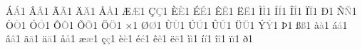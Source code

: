 {        {^^c1}{{\textcolor{gray}{\'{A}}}}1  %
        {^^c2}{{\textcolor{gray}{\^{A}}}}1  %
        {^^c3}{{\textcolor{gray}{\~{A}}}}1  %
        {^^c4}{{\textcolor{gray}{\"{A}}}}1  %
        {^^c5}{{\textcolor{gray}{\AA}}}1  %
        {^^c6}{{\textcolor{gray}{\AE}}}1  %
        {^^c7}{{\textcolor{gray}{\c{C}}}}1  %
        {^^c8}{{\textcolor{gray}{\`{E}}}}1  %
        {^^c9}{{\textcolor{gray}{\'{E}}}}1  %
        {^^ca}{{\textcolor{gray}{\^{E}}}}1  %
        {^^cb}{{\textcolor{gray}{\"{E}}}}1  %
        {^^cc}{{\textcolor{gray}{\`{I}}}}1  %
        {^^cd}{{\textcolor{gray}{\'{I}}}}1  %
        {^^ce}{{\textcolor{gray}{\^{I}}}}1  %
        {^^cf}{{\textcolor{gray}{\"{I}}}}1  %
        {^^d0}{{\textcolor{gray}{\DH}}}1  %
        {^^d1}{{\textcolor{gray}{\~{N}}}}1  %
        {^^d2}{{\textcolor{gray}{\`{O}}}}1  %
        {^^d3}{{\textcolor{gray}{\'{O}}}}1  %
        {^^d4}{{\textcolor{gray}{\^{O}}}}1  %
        {^^d5}{{\textcolor{gray}{\~{O}}}}1  %
        {^^d6}{{\textcolor{gray}{\"{O}}}}1  %
        {^^d7}{{\textcolor{gray}{\texttimes}}}1  %
        {^^d8}{{\textcolor{gray}{\O}}}1  %
        {^^d9}{{\textcolor{gray}{\`{U}}}}1  %
        {^^da}{{\textcolor{gray}{\'{U}}}}1  %
        {^^db}{{\textcolor{gray}{\^{U}}}}1  %
        {^^dc}{{\textcolor{gray}{\"{U}}}}1  %
        {^^dd}{{\textcolor{gray}{\'{Y}}}}1  %
        {^^de}{{\textcolor{gray}{\TH}}}1  %
        {^^df}{{\textcolor{gray}{\ss}}}1  %
        {^^e0}{{\textcolor{gray}{\`{a}}}}1  %
        {^^e1}{{\textcolor{gray}{\'{a}}}}1  %
        {^^e2}{{\textcolor{gray}{\^{a}}}}1  %
        {^^e3}{{\textcolor{gray}{\~{a}}}}1  %
        {^^e4}{{\textcolor{gray}{\"{a}}}}1  %
        {^^e5}{{\textcolor{gray}{\aa}}}1  %
        {^^e6}{{\textcolor{gray}{\ae}}}1  %
        {^^e7}{{\textcolor{gray}{\c{c}}}}1  %
        {^^e8}{{\textcolor{gray}{\`{e}}}}1  %
        {^^e9}{{\textcolor{gray}{\'{e}}}}1  %
        {^^ea}{{\textcolor{gray}{\^{e}}}}1  %
        {^^eb}{{\textcolor{gray}{\"{e}}}}1  %
        {^^ec}{{\textcolor{gray}{\`{i}}}}1  %
        {^^ed}{{\textcolor{gray}{\'{i}}}}1  %
        {^^ee}{{\textcolor{gray}{\^{i}}}}1  %
        {^^ef}{{\textcolor{gray}{\"{i}}}}1  %
        {^^f0}{{\textcolor{gray}{\dh}}}1  %
}

